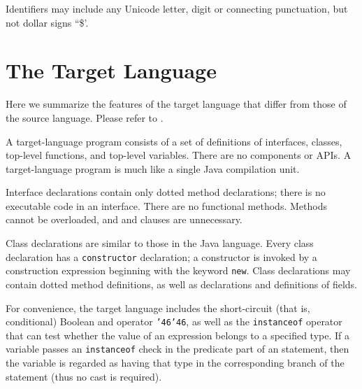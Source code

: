 

Identifiers may include any Unicode letter, digit or connecting punctuation, but not dollar signs ``\$'.



\section{The Target Language}

Here we summarize the features of the target language that differ from those of the source language.  Please refer to .

A target-language program consists of a set of definitions of interfaces, classes, top-level functions,
and top-level variables.  There are no components or APIs.  A target-language program
is much like a single Java compilation unit.

Interface declarations contain only dotted method declarations;
there is no executable code in an interface.
There are no functional methods.
Methods cannot be overloaded, and  and  clauses are unnecessary.

Class declarations are similar to those in the Java language.
Every class declaration has a {\tt constructor} declaration;
a constructor is invoked by a construction expression beginning with the keyword {\tt new}.
Class declarations may contain dotted method definitions,
as well as declarations and definitions of fields.

For convenience, the target language includes the short-circuit (that is, conditional)
Boolean {\sc and} operator {\tt \char'46\char'46}, as well as the {\tt instanceof} operator
that can test whether the value of an expression belongs to a specified type.
If a variable passes an {\tt instanceof} check in the predicate part of
an  statement, then the variable is regarded as having that type in the corresponding
 branch of the  statement (thus no cast is required).

